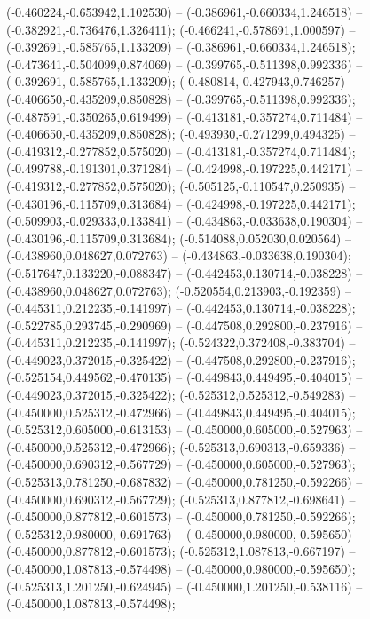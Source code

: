  (-0.460224,-0.653942,1.102530) -- (-0.386961,-0.660334,1.246518) -- (-0.382921,-0.736476,1.326411);
 (-0.466241,-0.578691,1.000597) -- (-0.392691,-0.585765,1.133209) -- (-0.386961,-0.660334,1.246518);
 (-0.473641,-0.504099,0.874069) -- (-0.399765,-0.511398,0.992336) -- (-0.392691,-0.585765,1.133209);
 (-0.480814,-0.427943,0.746257) -- (-0.406650,-0.435209,0.850828) -- (-0.399765,-0.511398,0.992336);
 (-0.487591,-0.350265,0.619499) -- (-0.413181,-0.357274,0.711484) -- (-0.406650,-0.435209,0.850828);
 (-0.493930,-0.271299,0.494325) -- (-0.419312,-0.277852,0.575020) -- (-0.413181,-0.357274,0.711484);
 (-0.499788,-0.191301,0.371284) -- (-0.424998,-0.197225,0.442171) -- (-0.419312,-0.277852,0.575020);
 (-0.505125,-0.110547,0.250935) -- (-0.430196,-0.115709,0.313684) -- (-0.424998,-0.197225,0.442171);
 (-0.509903,-0.029333,0.133841) -- (-0.434863,-0.033638,0.190304) -- (-0.430196,-0.115709,0.313684);
 (-0.514088,0.052030,0.020564) -- (-0.438960,0.048627,0.072763) -- (-0.434863,-0.033638,0.190304);
 (-0.517647,0.133220,-0.088347) -- (-0.442453,0.130714,-0.038228) -- (-0.438960,0.048627,0.072763);
 (-0.520554,0.213903,-0.192359) -- (-0.445311,0.212235,-0.141997) -- (-0.442453,0.130714,-0.038228);
 (-0.522785,0.293745,-0.290969) -- (-0.447508,0.292800,-0.237916) -- (-0.445311,0.212235,-0.141997);
 (-0.524322,0.372408,-0.383704) -- (-0.449023,0.372015,-0.325422) -- (-0.447508,0.292800,-0.237916);
 (-0.525154,0.449562,-0.470135) -- (-0.449843,0.449495,-0.404015) -- (-0.449023,0.372015,-0.325422);
 (-0.525312,0.525312,-0.549283) -- (-0.450000,0.525312,-0.472966) -- (-0.449843,0.449495,-0.404015);
 (-0.525312,0.605000,-0.613153) -- (-0.450000,0.605000,-0.527963) -- (-0.450000,0.525312,-0.472966);
 (-0.525313,0.690313,-0.659336) -- (-0.450000,0.690312,-0.567729) -- (-0.450000,0.605000,-0.527963);
 (-0.525313,0.781250,-0.687832) -- (-0.450000,0.781250,-0.592266) -- (-0.450000,0.690312,-0.567729);
 (-0.525313,0.877812,-0.698641) -- (-0.450000,0.877812,-0.601573) -- (-0.450000,0.781250,-0.592266);
 (-0.525312,0.980000,-0.691763) -- (-0.450000,0.980000,-0.595650) -- (-0.450000,0.877812,-0.601573);
 (-0.525312,1.087813,-0.667197) -- (-0.450000,1.087813,-0.574498) -- (-0.450000,0.980000,-0.595650);
 (-0.525313,1.201250,-0.624945) -- (-0.450000,1.201250,-0.538116) -- (-0.450000,1.087813,-0.574498);
